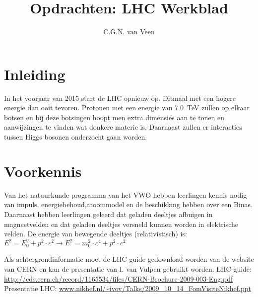 

\usepackage{hepnames} 
\usepackage[version=3]{mhchem}
\usepackage{lipsum}
\usepackage{pgfplots}
\usepackage{amsmath}
\usepackage{tikz}
\usetikzlibrary{shapes}
\usetikzlibrary{positioning,arrows}
\usetikzlibrary{decorations.pathmorphing}
\usetikzlibrary{decorations.markings}


\DeclareRobustCommand{\PgDpp}{\HepParticle{\Delta}{}{++}\xspace}

\title{Opdrachten: LHC Werkblad} 
\author{C.G.N. van Veen}



\maketitle

\section{Inleiding} In het voorjaar van 2015 start de LHC opnieuw op. Ditmaal 
met een hogere energie dan ooit tevoren. Protonen met een energie van \SI{7.0}{\tera\electronvolt}
zullen op elkaar botsen en bij deze botsingen hoopt men extra dimensies aan te tonen en 
aanwijzingen te vinden wat donkere materie is. Daarnaast zullen er interacties tussen Higgs bosonen 
onderzocht gaan worden.

\section{Voorkennis}

Van het natuurkunde programma van het VWO hebben leerlingen kennis nodig van impuls, 
energiebehoud,atoommodel en de beschikking hebben over een Binas.
Daarnaast hebben leerlingen geleerd dat geladen deeltjes afbuigen in magneetvelden en dat 
geladen deeltjes versneld kunnen worden in elektrische velden.
De energie van bewegende deeltjes (relativistisch) is:\\
$E^2 = E_0^2 + p^2 \cdot c^2 \rightarrow  E^2 = m_0^2 \cdot c^4 + p^2 \cdot c^2 $

Als achtergrondinformatie moet de LHC guide gedownload worden van de 
website van CERN en kan de presentatie van I. van Vulpen gebruikt worden. 
LHC-guide: \url{http://cds.cern.ch/record/1165534/files/CERN-Brochure-2009-003-Eng.pdf}
Presentatie LHC: \url{www.nikhef.nl/~ivov/Talks/2009_10_14_FomVisiteNikhef.ppt}

